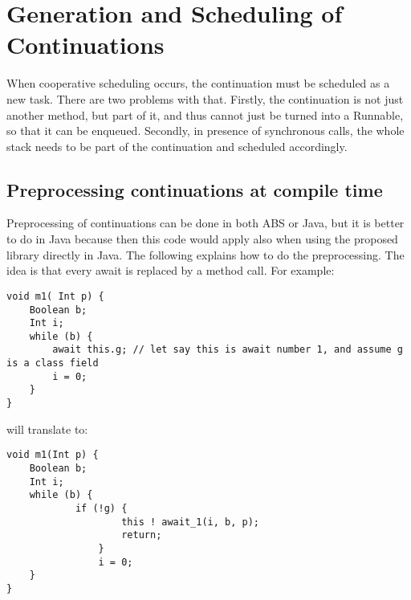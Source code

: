 \section{Generation and Scheduling of Continuations}
\label{comp}

When cooperative scheduling occurs, the continuation must be scheduled as a new task. There are two problems with that. Firstly, the continuation is not just another method, but part of it, and thus cannot just be turned into a Runnable, so that it can be enqueued. Secondly, in presence of synchronous calls, the whole stack needs to be part of the continuation and scheduled accordingly. 


\subsection{Preprocessing continuations at compile time}
Preprocessing of continuations can be done in both ABS or Java, but it is better to do in Java because then this code would apply also when using the proposed library directly in Java. The following explains how to do the preprocessing. The idea is that every await is replaced by a method call. For example:

\begin{lstlisting}
void m1( Int p) {
	Boolean b;
	Int i;
	while (b) {
		await this.g; // let say this is await number 1, and assume g is a class field
		i = 0;
	}
}
\end{lstlisting}

will translate to:
\begin{lstlisting}
void m1(Int p) {
	Boolean b;
	Int i;
	while (b) { 
			if (!g) {
					this ! await_1(i, b, p); 
					return;
				}
				i = 0;
	}
}
\end{lstlisting}

